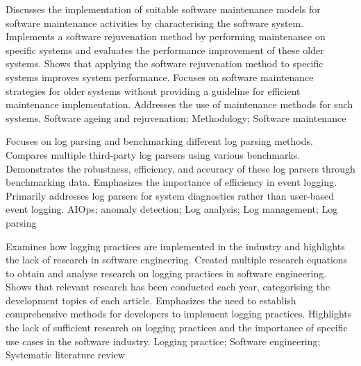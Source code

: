 {
    Discusses the implementation of suitable software maintenance models for software maintenance activities by characterising the software system.
}
{
    Implements a software rejuvenation method by performing maintenance on specific systems and evaluates the performance improvement of these older systems.
}
{
    Shows that applying the software rejuvenation method to specific systems improves system performance.
}
{
    Focuses on software maintenance strategies for older systems without providing a guideline for efficient maintenance implementation. Addresses the use of maintenance methods for such systems.
}
{
    Software ageing and rejuvenation; Methodology; Software maintenance
}

{
    Focuses on log parsing and benchmarking different log parsing methods.
}
{
    Compares multiple third-party log parsers using various benchmarks.
}
{
    Demonstrates the robustness, efficiency, and accuracy of these log parsers through benchmarking data.
}
{
    Emphasizes the importance of efficiency in event logging. Primarily addresses log parsers for system diagnostics rather than user-based event logging.
}
{
    AIOps; anomaly detection; Log analysis; Log management; Log parsing
}

{
    Examines how logging practices are implemented in the industry and highlights the lack of research in software engineering.
}
{
    Created multiple research equations to obtain and analyse research on logging practices in software engineering.
}
{
    Shows that relevant research has been conducted each year, categorising the development topics of each article.
}
{
    Emphasizes the need to establish comprehensive methods for developers to implement logging practices. Highlights the lack of sufficient research on logging practices and the importance of specific use cases in the software industry.
}
{
    Logging practice; Software engineering; Systematic literature review
}

